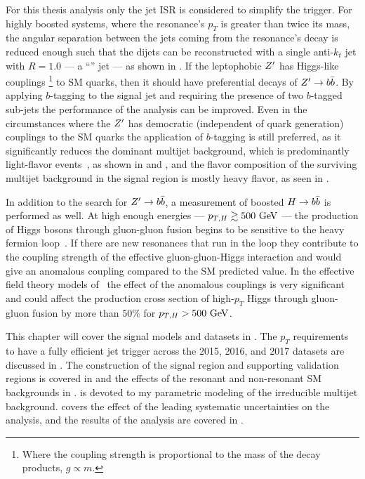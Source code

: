 For this thesis analysis only the jet ISR is considered to simplify the trigger.
For highly boosted systems, where the resonance's $p_{T}$ is greater than twice its mass, the angular separation between the jets coming from the resonance's decay is reduced enough such that the dijets can be reconstructed with a single anti-$k_{t}$ jet with $R=1.0$ --- a ``\largeR{}'' jet --- as shown in .
If the leptophobic $Z^{\prime}$ has Higgs-like couplings%
\footnote{Where the coupling strength is proportional to the mass of the decay products, $g \propto m$.}
to SM quarks, then it should have preferential decays of $Z^{\prime} \to b\bar{b}$.
By applying $b$-tagging to the signal \largeR{} jet and requiring the presence of two $b$-tagged sub-jets the performance of the analysis can be improved.
Even in the circumstances where the $Z^{\prime}$ has democratic (independent of quark generation) couplings to the SM quarks the application of $b$-tagging is still preferred, as it significantly reduces the dominant multijet background, which is predominantly light-flavor events~\cite{STDM-2011-40}, as shown in  and , and the flavor composition of the surviving multijet background in the signal region is mostly heavy flavor, as seen in .

In addition to the search for $Z^{\prime} \to b\bar{b}$, a measurement of boosted $H \to b\bar{b}$ is performed as well.
At high enough energies --- $p_{T,H} \gtrsim 500~\mathrm{GeV}$ --- the production of Higgs bosons through gluon-gluon fusion begins to be sensitive to the heavy fermion loop~\cite{Schlaffer:2014osa}.
If there are new resonances that run in the loop they contribute to the coupling strength of the effective gluon-gluon-Higgs interaction and would give an anomalous coupling compared to the SM predicted value.
In the effective field theory models of~\cite{Schlaffer:2014osa,Grojean:2013nya,Dawson:2015gka} the effect of the anomalous couplings is very significant and could affect the production cross section of high-$p_{T}$ Higgs through gluon-gluon fusion by more than $50\%$ for $p_{T,H} > 500~\mathrm{GeV}$.

This chapter will cover the signal models and datasets in .
The $p_{T}$ requirements to have a fully efficient \largeR{} jet trigger across the 2015, 2016, and 2017 datasets are discussed in .
The construction of the signal region and supporting validation regions is covered in  and the effects of the resonant and non-resonant SM backgrounds in .
 is devoted to my parametric modeling of the irreducible multijet background.
 covers the effect of the leading systematic uncertainties on the analysis, and the results of the analysis are covered in .


